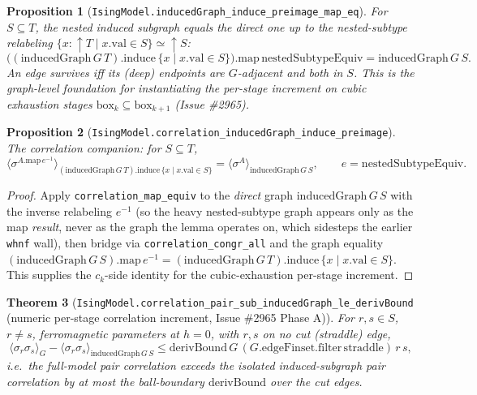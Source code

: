 \documentclass[a4paper,11pt]{article}
\newtheorem{theorem}{Theorem}
\newtheorem{proposition}[theorem]{Proposition}
\begin{document}
\begin{proposition}[\texttt{IsingModel.inducedGraph\_induce\_preimage\_map\_eq}]
For $S\subseteq T$, the nested induced subgraph equals the direct one up to the
nested-subtype relabeling $\{x:\uparrow T\mid x.\mathrm{val}\in S\}\simeq\uparrow S$:
\[
  \bigl((\mathrm{inducedGraph}\,G\,T).\mathrm{induce}\,\{x\mid x.\mathrm{val}\in S\}\bigr)
    .\mathrm{map}\,\mathrm{nestedSubtypeEquiv}
  = \mathrm{inducedGraph}\,G\,S.
\]
An edge survives iff its (deep) endpoints are $G$-adjacent and both in $S$. This
is the graph-level foundation for instantiating the per-stage increment on cubic
exhaustion stages $\mathrm{box}_k\subseteq\mathrm{box}_{k+1}$ (Issue \#2965).
\end{proposition}

\begin{proposition}[\texttt{IsingModel.correlation\_inducedGraph\_induce\_preimage}]
The correlation companion: for $S\subseteq T$,
\[
  \langle\sigma^{A.\mathrm{map}\,e^{-1}}\rangle_{(\mathrm{inducedGraph}\,G\,T).\mathrm{induce}\,\{x\mid x.\mathrm{val}\in S\}}
  = \langle\sigma^{A}\rangle_{\mathrm{inducedGraph}\,G\,S},
  \qquad e=\mathrm{nestedSubtypeEquiv}.
\]
\end{proposition}

\begin{proof}
Apply \texttt{correlation\_map\_equiv} to the \emph{direct} graph
$\mathrm{inducedGraph}\,G\,S$ with the inverse relabeling $e^{-1}$ (so the heavy
nested-subtype graph appears only as the map \emph{result}, never as the graph
the lemma operates on, which sidesteps the earlier \texttt{whnf} wall), then
bridge via \texttt{correlation\_congr\_all} and the graph equality
$(\mathrm{inducedGraph}\,G\,S).\mathrm{map}\,e^{-1}
= (\mathrm{inducedGraph}\,G\,T).\mathrm{induce}\,\{x\mid x.\mathrm{val}\in S\}$.
This supplies the $c_k$-side identity for the cubic-exhaustion per-stage
increment.
\end{proof}

\begin{theorem}[\texttt{IsingModel.correlation\_pair\_sub\_inducedGraph\_le\_derivBound}
(numeric per-stage correlation increment, Issue \#2965 Phase A)]
For $r,s\in S$, $r\neq s$, ferromagnetic parameters at $h=0$, with $r,s$ on no
cut (straddle) edge,
\[
  \langle\sigma_r\sigma_s\rangle_{G}
    - \langle\sigma_r\sigma_s\rangle_{\mathrm{inducedGraph}\,G\,S}
  \le \mathrm{derivBound}\,G\,(G.\mathrm{edgeFinset.filter}\,\mathrm{straddle})\,r\,s,
\]
i.e.\ the full-model pair correlation exceeds the isolated induced-subgraph pair
correlation by at most the ball-boundary $\mathrm{derivBound}$ over the cut edges.
\end{theorem}
\end{document}
